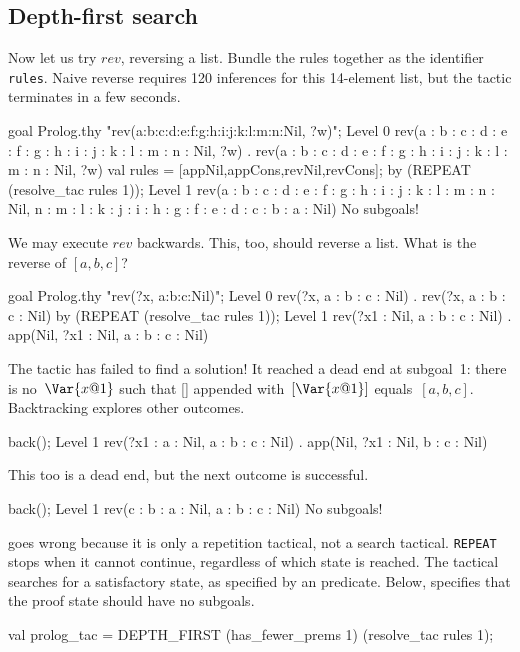 \subsection{Depth-first search}
Now let us try $rev$, reversing a list.
Bundle the rules together as the \ML{} identifier {\tt rules}.  Naive
reverse requires 120 inferences for this 14-element list, but the tactic
terminates in a few seconds.
\begin{ttbox}
goal Prolog.thy "rev(a:b:c:d:e:f:g:h:i:j:k:l:m:n:Nil, ?w)";
{\out Level 0}
{\out rev(a : b : c : d : e : f : g : h : i : j : k : l : m : n : Nil, ?w)}
{. rev(a : b : c : d : e : f : g : h : i : j : k : l : m : n : Nil,}
{\out         ?w)}
\ttbreak
val rules = [appNil,appCons,revNil,revCons];
\ttbreak
by (REPEAT (resolve_tac rules 1));
{\out Level 1}
{\out rev(a : b : c : d : e : f : g : h : i : j : k : l : m : n : Nil,}
{\out     n : m : l : k : j : i : h : g : f : e : d : c : b : a : Nil)}
{\out No subgoals!}
\end{ttbox}
We may execute $rev$ backwards.  This, too, should reverse a list.  What
is the reverse of $[a,b,c]$?
\begin{ttbox}
goal Prolog.thy "rev(?x, a:b:c:Nil)";
{\out Level 0}
{\out rev(?x, a : b : c : Nil)}
{. rev(?x, a : b : c : Nil)}
\ttbreak
by (REPEAT (resolve_tac rules 1));
{\out Level 1}
{\out rev(?x1 : Nil, a : b : c : Nil)}
{. app(Nil, ?x1 : Nil, a : b : c : Nil)}
\end{ttbox}
The tactic has failed to find a solution!  It reached a dead end at
subgoal~1: there is no~$\Var{x@1}$ such that [] appended with~$[\Var{x@1}]$
equals~$[a,b,c]$.  Backtracking explores other outcomes.
\begin{ttbox}
back();
{\out Level 1}
{\out rev(?x1 : a : Nil, a : b : c : Nil)}
{. app(Nil, ?x1 : Nil, b : c : Nil)}
\end{ttbox}
This too is a dead end, but the next outcome is successful.
\begin{ttbox}
back();
{\out Level 1}
{\out rev(c : b : a : Nil, a : b : c : Nil)}
{\out No subgoals!}
\end{ttbox}
 goes wrong because it is only a repetition tactical, not a
search tactical.  {\tt REPEAT} stops when it cannot continue, regardless of
which state is reached.  The tactical  searches for a
satisfactory state, as specified by an \ML{} predicate.  Below,
 specifies that the proof state should have no
subgoals.
\begin{ttbox}
val prolog_tac = DEPTH_FIRST (has_fewer_prems 1) 
                             (resolve_tac rules 1);
\end{ttbox}
